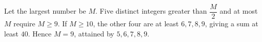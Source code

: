 Let the largest number be $M$. Five distinct integers greater than $\dfrac{M}{2}$ and at most $M$ require $M\ge9$. If $M\ge10$, the other four are at least $6,7,8,9$, giving a sum at least $40$. Hence $M=9$, attained by $5,6,7,8,9$.
